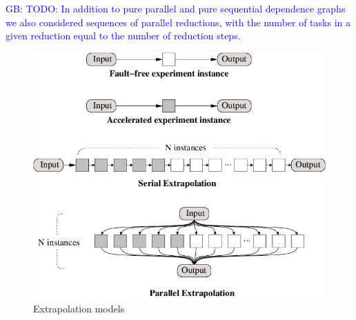 \documentclass[10pt, conference, compsocconf]{IEEEtran}
\newcommand{\greg}[1]{%
  \textcolor{blue}{GB: #1}
}
\begin{document}
\greg{TODO: In addition to pure parallel and pure sequential dependence graphs we also considered sequences of parallel reductions, with the number of tasks in a given reduction equal to the number of reduction steps.}

\begin{figure}[ht!]
\centering
\includegraphics[width=1.00\columnwidth]{figs/extrapolates.png}
\caption{Extrapolation models}
\label{fig:extrapolations}
\end{figure}
\end{document}
